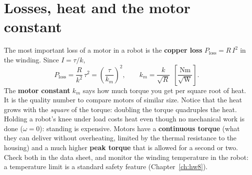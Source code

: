 \section*{Losses, heat and the motor constant}
The most important loss of a motor in a robot is the \textbf{copper loss} $P_\text{loss}=R\,I^2$ in the winding. Since $I=\tau/k$,
\[
P_\text{loss}=\frac{R}{k^2}\,\tau^2=\left(\frac{\tau}{k_m}\right)^2,\qquad k_m=\frac{k}{\sqrt R}\ \ \left[\frac{\text{Nm}}{\sqrt{\text{W}}}\right].
\]
The \textbf{motor constant} $k_m$ says how much torque you get per square root of heat. It is the quality number to compare motors of similar size. Notice that the heat grows with the \emph{square} of the torque: doubling the torque quadruples the heat. Holding a robot's knee under load costs heat even though no mechanical work is done ($\omega=0$): standing is expensive. Motors have a \textbf{continuous torque} (what they can deliver without overheating, limited by the thermal resistance to the housing) and a much higher \textbf{peak torque} that is allowed for a second or two. Check both in the data sheet, and monitor the winding temperature in the robot: a temperature limit is a standard safety feature (Chapter~\ref{ch:hw8}).

